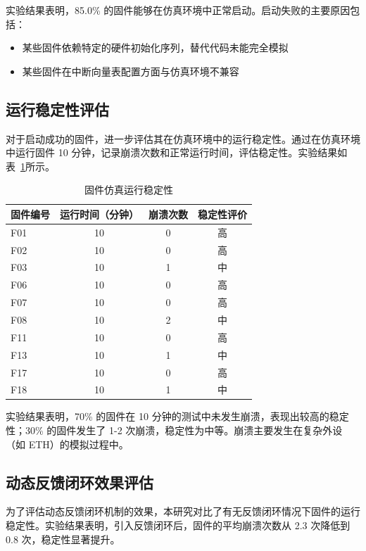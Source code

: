 实验结果表明，85.0\% 的固件能够在仿真环境中正常启动。启动失败的主要原因包括：
\begin{itemize}
    \item 某些固件依赖特定的硬件初始化序列，替代代码未能完全模拟
    \item 某些固件在中断向量表配置方面与仿真环境不兼容
\end{itemize}

\subsection{运行稳定性评估}

对于启动成功的固件，进一步评估其在仿真环境中的运行稳定性。通过在仿真环境中运行固件 10 分钟，记录崩溃次数和正常运行时间，评估稳定性。实验结果如表~\ref{tab:stability_results}所示。

\begin{table}[htbp]
\centering
\caption{固件仿真运行稳定性}
\label{tab:stability_results}
\begin{tabular}{lccc}
\toprule
\textbf{固件编号} & \textbf{运行时间（分钟）} & \textbf{崩溃次数} & \textbf{稳定性评价} \\
\midrule
F01 & 10 & 0 & 高 \\
F02 & 10 & 0 & 高 \\
F03 & 10 & 1 & 中 \\
F06 & 10 & 0 & 高 \\
F07 & 10 & 0 & 高 \\
F08 & 10 & 2 & 中 \\
F11 & 10 & 0 & 高 \\
F13 & 10 & 1 & 中 \\
F17 & 10 & 0 & 高 \\
F18 & 10 & 1 & 中 \\
\bottomrule
\end{tabular}
\end{table}

实验结果表明，70\% 的固件在 10 分钟的测试中未发生崩溃，表现出较高的稳定性；30\% 的固件发生了 1-2 次崩溃，稳定性为中等。崩溃主要发生在复杂外设（如 ETH）的模拟过程中。

\subsection{动态反馈闭环效果评估}

为了评估动态反馈闭环机制的效果，本研究对比了有无反馈闭环情况下固件的运行稳定性。实验结果表明，引入反馈闭环后，固件的平均崩溃次数从 2.3 次降低到 0.8 次，稳定性显著提升。

